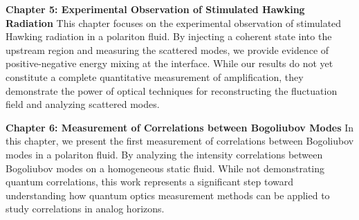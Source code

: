 \textbf{Chapter 5: Experimental Observation of Stimulated Hawking Radiation}  
This chapter focuses on the experimental observation of stimulated Hawking radiation in a polariton fluid. By injecting a coherent state into the upstream region and measuring the scattered modes, we provide evidence of positive-negative energy mixing at the interface. While our results do not yet constitute a complete quantitative measurement of amplification, they demonstrate the power of optical techniques for reconstructing the fluctuation field and analyzing scattered modes.

\textbf{Chapter 6: Measurement of Correlations between Bogoliubov Modes}
In this chapter, we present the first measurement of correlations between Bogoliubov modes in a polariton fluid. By analyzing the intensity correlations between Bogoliubov modes on a homogeneous static fluid.
While not demonstrating quantum correlations, this work represents a significant step toward understanding how quantum optics measurement methods can be applied to study correlations in analog horizons.